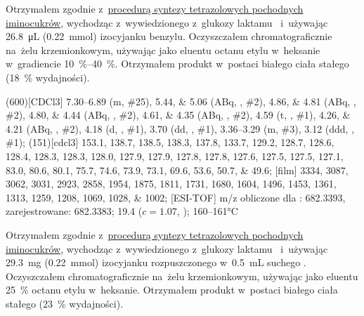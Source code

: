 Otrzymałem zgodnie z~\hyperref[experimental:sugars:schwartz]{procedurą syntezy tetrazolowych
  pochodnych iminocukrów}, wychodząc z~wywiedzionego z~glukozy laktamu~
  i~używając \SI{26.8}{\micro\liter} (\SI{0.22}{\milli\mol}) izocyjanku benzylu.
Oczyszczałem chromatograficznie na~żelu krzemionkowym,
  używając jako eluentu octanu etylu w~heksanie w~gradiencie \SIrange{10}{40}{\percent}.
Otrzymałem produkt w~postaci białego ciała stałego (\SI{18}{\percent} wydajności).

\begin{fullexp}
  \NMR(600)[CDCl3] \numrange{7.30}{6.89} (m, \#{25}), \numlist{5.44;5.06} (ABq, , \#{2}), \numlist{4.86;4.81} (ABq, , \#{2}), \numlist{4.80;4.44} (ABq, , \#{2}), \numlist{4.61;4.35} (ABq, , \#{2}), \num{4.59} (t, , \#{1}), \numlist{4.26;4.21} (ABq, , \#{2}), \num{4.18} (d, , \#{1}), \num{3.70} (dd, , \#{1}), \numrange{3.36}{3.29} (m, \#{3}), \num{3.12} (ddd, , \#{1});
  (151)[cdcl3] \numlist{153.1; 138.7; 138.5; 138.3; 137.8; 133.7; 129.2; 128.7; 128.6; 128.4; 128.3; 128.3; 128.0; 127.9; 127.9; 127.8; 127.8; 127.6; 127.5; 127.5; 127.1; 83.0; 80.6; 80.1; 75.7; 74.6; 73.9; 73.1; 69.6; 53.6; 50.7; 49.6};
  [film] \numlist{3334; 3087; 3062; 3031; 2923; 2858; 1954; 1875; 1811; 1731; 1680; 1604; 1496; 1453; 1361; 1313; 1259; 1208; 1069; 1028; 1002};
  [ESI-TOF] m/z obliczone dla : \num{682.3393}, zarejestrowane: \num{682.3383};
  \data{[$\alpha^{23}_D$]~$=$} \num{19.4} ($c = 1.07$, );
   \numrange{160}{161}\si{\celsius}
\end{fullexp}

Otrzymałem zgodnie z~\hyperref[experimental:sugars:schwartz]{procedurą syntezy tetrazolowych
  pochodnych iminocukrów}, wychodząc z~wywiedzionego z~glukozy laktamu~
  i~używając \SI{29.3}{\milli\gram} (\SI{0.22}{\milli\mol}) izocyjanku 
  rozpuszczonego w~\SI{0.5}{\milli\liter} suchego .
Oczyszczałem chromatograficznie na~żelu krzemionkowym,
  używając jako eluentu \SI{25}{\percent} octanu etylu w~heksanie.
Otrzymałem produkt w~postaci białego ciała stałego (\SI{23}{\percent} wydajności).

